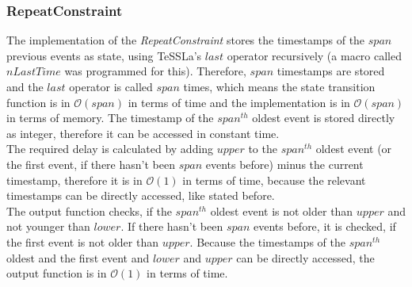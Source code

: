\subsubsection{RepeatConstraint}
	The implementation of the \emph{RepeatConstraint} stores the timestamps of the $span$ previous events as state, using TeSSLa's $last$ operator recursively (a macro called $nLastTime$ was programmed for this). Therefore, $span$ timestamps are stored and the $last$ operator is called $span$ times, which means the state transition function is in $\mathcal{O}(span)$ in terms of time and the implementation is in $\mathcal{O}(span)$ in terms of memory. The timestamp of the $span^{th}$ oldest event is stored directly as integer, therefore it can be accessed in constant time.\\
	The required delay is calculated by adding $upper$ to the  $span^{th}$ oldest event (or the first event, if there hasn't been $span$ events before) minus the current timestamp, therefore it is in $\mathcal{O}(1)$ in terms of time, because the relevant timestamps can be directly accessed, like stated before.\\
	The output function checks, if the $span^{th}$ oldest event is not older than $upper$ and not younger than $lower$. If there hasn't been $span$ events before, it is checked, if the first event is not older than $upper$. Because the timestamps of the $span^{th}$ oldest and the first event and $lower$ and $upper$ can be directly accessed, the output function is in $\mathcal{O}(1)$ in terms of time.
	
